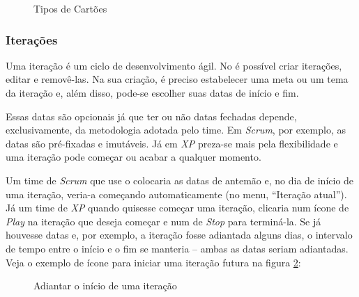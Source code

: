 \begin{figure}[H]
  \centering
  \caption{Tipos de Cartões}\label{figura:tipo_cartao}
\end{figure}

\subsubsection*{Iterações}

Uma iteração é um ciclo de desenvolvimento ágil. No \calopsita{} é possível criar iterações, editar e removê-las. Na sua criação, é preciso estabelecer uma meta ou um tema da iteração e, além disso, pode-se escolher suas datas de início e fim.

Essas datas são opcionais já que ter ou não datas fechadas depende, exclusivamente, da metodologia adotada pelo time. Em \textit{Scrum}, por exemplo, as datas são pré-fixadas e imutáveis. Já em \textit{XP} preza-se mais pela flexibilidade e uma iteração pode começar ou acabar a qualquer momento.

Um time de \textit{Scrum} que use o \calopsita{} colocaria as datas de antemão e, no dia de início de uma iteração, veria-a começando automaticamente (no menu, ``Iteração atual''). Já um time de \textit{XP} quando quisesse começar uma iteração, clicaria num ícone de \textit{Play} na iteração que deseja começar e num de \textit{Stop} para terminá-la. Se já houvesse datas e, por exemplo, a iteração fosse adiantada alguns dias, o intervalo de tempo entre o início e o fim se manteria -- ambas as datas seriam adiantadas. Veja o exemplo de ícone para iniciar uma iteração futura na figura \ref{figura:play}:

\begin{figure}[H]
  \centering
  \caption{Adiantar o início de uma iteração}\label{figura:play}
\end{figure}

